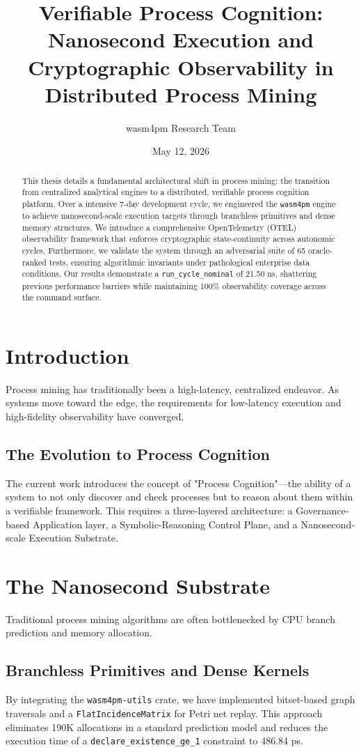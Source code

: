 \documentclass[12pt,a4paper]{report}
\title{\textbf{Verifiable Process Cognition: Nanosecond Execution and Cryptographic Observability in Distributed Process Mining}}
\author{wasm4pm Research Team}
\date{May 12, 2026}
\begin{document}
\maketitle

\begin{abstract}
This thesis details a fundamental architectural shift in process mining: the transition from centralized analytical engines to a distributed, verifiable process cognition platform. Over a intensive 7-day development cycle, we engineered the \texttt{wasm4pm} engine to achieve nanosecond-scale execution targets through branchless primitives and dense memory structures. We introduce a comprehensive OpenTelemetry (OTEL) observability framework that enforces cryptographic state-continuity across autonomic cycles. Furthermore, we validate the system through an adversarial suite of 65 oracle-ranked tests, ensuring algorithmic invariants under pathological enterprise data conditions. Our results demonstrate a \texttt{run\_cycle\_nominal} of 21.50 ns, shattering previous performance barriers while maintaining 100\% observability coverage across the command surface.
\end{abstract}

\chapter{Introduction}
Process mining has traditionally been a high-latency, centralized endeavor. As systems move toward the edge, the requirements for low-latency execution and high-fidelity observability have converged. 

\section{The Evolution to Process Cognition}
The current work introduces the concept of "Process Cognition"—the ability of a system to not only discover and check processes but to reason about them within a verifiable framework. This requires a three-layered architecture: a Governance-based Application layer, a Symbolic-Reasoning Control Plane, and a Nanosecond-scale Execution Substrate.

\chapter{The Nanosecond Substrate}
Traditional process mining algorithms are often bottlenecked by CPU branch prediction and memory allocation.

\section{Branchless Primitives and Dense Kernels}
By integrating the \texttt{wasm4pm-utils} crate, we have implemented bitset-based graph traversals and a \texttt{FlatIncidenceMatrix} for Petri net replay. This approach eliminates 190K allocations in a standard prediction model and reduces the execution time of a \texttt{declare\_existence\_ge\_1} constraint to 486.84 ps.
\end{document}
